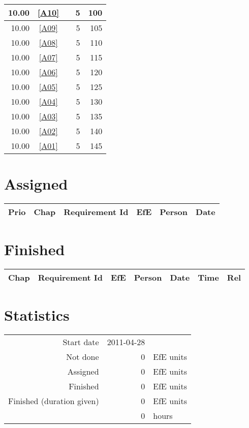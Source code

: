 \begin{longtable}{|r|c|p{7cm}||r|r|}
10.00 & \ref{A10} & \nameref{A10} & 5 & 100 \\ \hline
10.00 & \ref{A09} & \nameref{A09} & 5 & 105 \\ \hline
10.00 & \ref{A08} & \nameref{A08} & 5 & 110 \\ \hline
10.00 & \ref{A07} & \nameref{A07} & 5 & 115 \\ \hline
10.00 & \ref{A06} & \nameref{A06} & 5 & 120 \\ \hline
10.00 & \ref{A05} & \nameref{A05} & 5 & 125 \\ \hline
10.00 & \ref{A04} & \nameref{A04} & 5 & 130 \\ \hline
10.00 & \ref{A03} & \nameref{A03} & 5 & 135 \\ \hline
10.00 & \ref{A02} & \nameref{A02} & 5 & 140 \\ \hline
10.00 & \ref{A01} & \nameref{A01} & 5 & 145 \\ \hline
\end{longtable}\section{Assigned}
\begin{longtable}{|r|c|p{6.5cm}||r|l|l|} \hline
\textbf{Prio} & \textbf{Chap} & \textbf{Requirement Id} & \textbf{EfE} & \textbf{Person} & \textbf{Date} \\ \hline\endhead
\end{longtable}\section{Finished}
{\small \begin{longtable}{|c|p{5.5cm}||r|l|l|r|r|} \hline
\textbf{Chap} & \textbf{Requirement Id} & \textbf{EfE} & \textbf{Person} & \textbf{Date} & \textbf{Time} & \textbf{Rel} \\ \hline\endhead
\end{longtable}}\section{Statistics}
\begin{longtable}{rrl}
Start date & 2011-04-28 & \\ 
Not done & 0 & EfE units \\ 
Assigned & 0 & EfE units \\ 
Finished & 0 & EfE units \\ 
Finished (duration given) & 0 & EfE units \\ 
 & 0 & hours \\ 
\end{longtable}